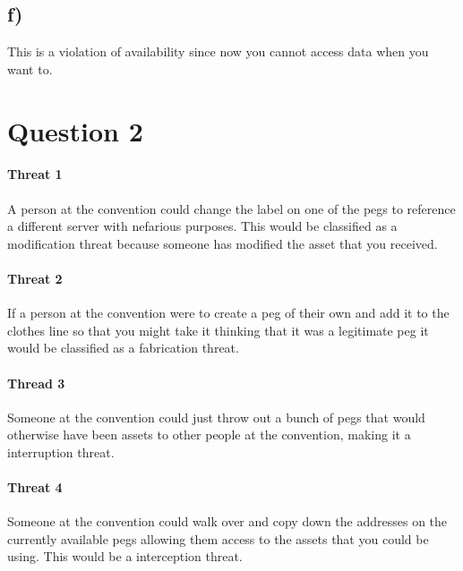 \documentclass{article}
\begin{document}
\subsection*{f)} %
\label{sub:f_}
This is a violation of availability since now you cannot access data when you want to.


\section*{Question 2} %
\label{sec:question_2}
\paragraph{Threat 1} %
\label{par:threat_1}
A person at the convention could change the label on one of the pegs to reference a different server with nefarious purposes. This would be classified as a modification threat because someone has modified the asset that you received.

\paragraph{Threat 2} %
\label{par:threat_2}
If a person at the convention were to create a peg of their own and add it to the clothes line so that you might take it thinking that it was a legitimate peg it would be classified as a fabrication threat.

\paragraph{Thread 3} %
\label{par:thread_3}
Someone at the convention could just throw out a bunch of pegs that would otherwise have been assets to other people at the convention, making it a interruption threat.

\paragraph{Threat 4} %
\label{par:threat_4}
Someone at the convention could walk over and copy down the addresses on the currently available pegs allowing them access to the assets that you could be using. This would be a interception threat.

\end{document}
